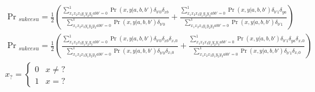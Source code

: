 \documentclass[10pt]{article} %
\begin{document}
\begin{gather}
\Pr{}_{sukcesu} = \frac{1}{2}\left(\frac{\sum_{x_1x_2x_3y_1y_2y_3abb'=0}^1\Pr(x,y|a,b,b')\delta_{b'0}\delta_{xb}}{\sum_{x_1x_2x_3y_1y_2y_3abb'=0}^1\Pr(x,y|a,b,b')\delta_{b'0}}+\frac{\sum_{x_1x_2x_3y_1y_2y_3abb'=0}^1\Pr(x,y|a,b,b')\delta_{b'1}\delta_{ya}}{\sum_{x_1x_2x_3y_1y_2y_3abb'=0}^1\Pr(x,y|a,b,b')\delta_{b'1}}\right) \\
\Pr{}_{sukcesu} = \frac{1}{2}\left(\frac{\sum_{x_1x_2x_3y_1y_2y_3abb'=0}^1\Pr(x,y|a,b,b')\delta_{b'0}\delta_{xb}\delta_{x_?0}}{\sum_{x_1x_2x_3y_1y_2y_3abb'=0}^1\Pr(x,y|a,b,b')\delta_{b'0}\delta_{x_?0}}+\frac{\sum_{x_1x_2x_3y_1y_2y_3abb'=0}^1\Pr(x,y|a,b,b')\delta_{b'1}\delta_{ya}\delta_{x_?0}}{\sum_{x_1x_2x_3y_1y_2y_3abb'=0}^1\Pr(x,y|a,b,b')\delta_{b'1}\delta_{x_?0}}\right) \\
x_? = \begin{cases}
0&x\neq ?\\
1&x = ?
\end{cases}
\end{gather}
\end{document}
